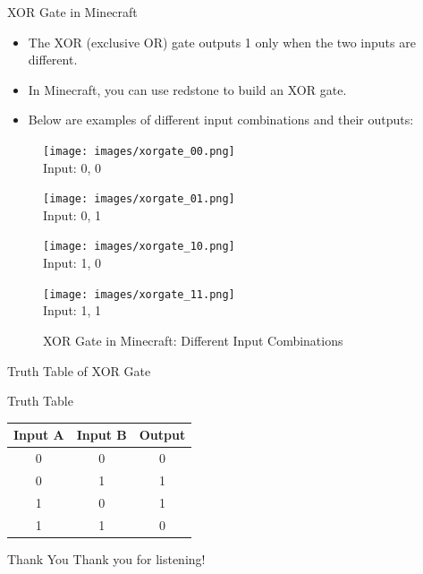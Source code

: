 \documentclass{beamer}
\begin{document}
\begin{frame}{XOR Gate in Minecraft}
    \begin{itemize}
        \item The XOR (exclusive OR) gate outputs 1 only when the two inputs are different.
        \item In Minecraft, you can use redstone to build an XOR gate.
        \item Below are examples of different input combinations and their outputs:
    \end{itemize}
    \begin{figure}[ht]
        \centering
        \begin{minipage}{0.24\textwidth}
            \centering
            \texttt{[image: images/xorgate\_00.png]}\\
            \small Input: 0, 0
        \end{minipage}
        \begin{minipage}{0.24\textwidth}
            \centering
            \texttt{[image: images/xorgate\_01.png]}\\
            \small Input: 0, 1
        \end{minipage}
        \begin{minipage}{0.24\textwidth}
            \centering
            \texttt{[image: images/xorgate\_10.png]}\\
            \small Input: 1, 0
        \end{minipage}
        \begin{minipage}{0.24\textwidth}
            \centering
            \texttt{[image: images/xorgate\_11.png]}\\
            \small Input: 1, 1
        \end{minipage}
        \caption{XOR Gate in Minecraft: Different Input Combinations}
    \end{figure}
\end{frame}

\begin{frame}{Truth Table of XOR Gate}
    \begin{block}{Truth Table}
        \begin{tabular}{|c|c|c|}
            \hline
            Input A & Input B & Output \\
            \hline
            0 & 0 & 0 \\
            0 & 1 & 1 \\
            1 & 0 & 1 \\
            1 & 1 & 0 \\
            \hline
        \end{tabular}
    \end{block}
\end{frame}

\begin{frame}{Thank You}
    \centering
    Thank you for listening!
\end{frame}
\end{document}
